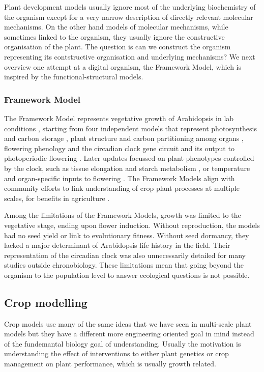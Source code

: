 Plant development models usually ignore most of the underlying biochemistry of
the organism except for a very narrow description of directly relevant molecular
mechanisms. On the other hand models of molecular mechanisms, while sometimes
linked to the organism, they usually ignore the constructive organisation of the
plant. The question is can we construct the organism representing its
contstructive organisation and underlying mechanisms? We next overview one
attempt at a digital organism, the Framework Model, which is inspired by the
functional-structural models.

\subsubsection*{Framework Model}
\label{subsec:fm}
The Framework Model represents vegetative growth of Arabidopsis in lab conditions
\citep{chew_multiscale_2014}, starting from four independent models that
represent photosynthesis and carbon storage \citep{rasse_leaf_2006}, plant
structure and carbon partitioning among organs
\citep{christophe_model-based_2008}, flowering phenology
\citep{chew_augmented_2012} and the circadian clock gene circuit and its output
to photoperiodic flowering \citep{salazar_prediction_2009}. Later updates
focussed on plant phenotypes controlled by the clock, such as tissue elongation
and starch metabolism \citep[FMv2;][]{chew_linking_2017}, or temperature and
organ-specific inputs to flowering
\citep{kinmonth-schultz_mechanistic_2018}. The Framework Models align with
community efforts to link understanding of crop plant processes at multiple
scales, for benefits in agriculture \citep{wu_connecting_2016, zhu_plants_2016}.

Among the limitations of the Framework Models, growth was limited to the
vegetative stage, ending upon flower induction. Without reproduction, the models
had no seed yield or link to evolutionary fitness. Without seed dormancy, they
lacked a major determinant of Arabidopsis life history in the field. Their
representation of the circadian clock was also unnecessarily detailed for many
studies outside chronobiology. These limitations mean that going beyond the
organism to the population level to answer ecological questions is not possible.

\subsection{Crop modelling}
Crop models use many of the same ideas that we have seen in multi-scale plant
models but they have a different more engineering oriented goal in mind instead
of the fundemantal biology goal of understanding. Usually the motivation is
understanding the effect of interventions to either plant genetics or crop
management on plant performance, which is usually growth related.

